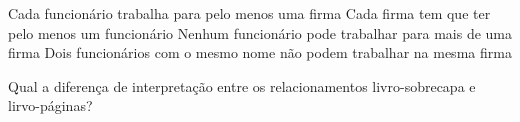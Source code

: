 \documentclass{lib/eng_softdoc}
\begin{document}
\subproblem Cada funcionário trabalha para pelo menos uma firma
\subproblem Cada firma tem que ter pelo menos um funcionário  
\subproblem Nenhum funcionário pode trabalhar para mais de uma firma
\subproblem Dois funcionários com o mesmo nome não podem trabalhar na mesma firma 

\vspace{0.5cm}

\problem Qual a diferença de interpretação entre os relacionamentos livro-sobrecapa e lirvo-páginas? 

\vspace{0.5cm}

\vspace{0.5cm}
\end{document}
